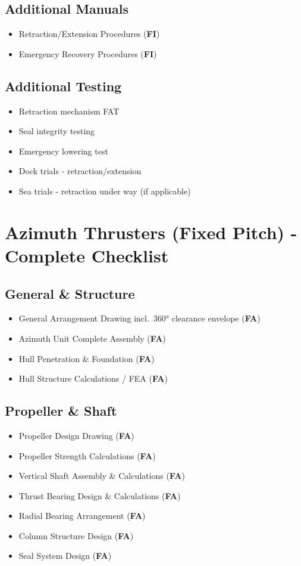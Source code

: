 \documentclass[11pt,a4paper]{report}
\newcommand{\fa}{\textbf{\textcolor{warningred}{FA}}}
\newcommand{\fic}{\textbf{\textcolor{bvgray}{FI}}}
\begin{document}
\subsection{Additional Manuals}
\begin{itemize}[label=$\square$]
\item Retraction/Extension Procedures (\fic{})
\item Emergency Recovery Procedures (\fic{})
\end{itemize}

\subsection{Additional Testing}
\begin{itemize}[label=$\square$]
\item Retraction mechanism FAT
\item Seal integrity testing
\item Emergency lowering test
\item Dock trials - retraction/extension
\item Sea trials - retraction under way (if applicable)
\end{itemize}

\section{Azimuth Thrusters (Fixed Pitch) - Complete Checklist}

\subsection{General \& Structure}
\begin{itemize}[label=$\square$]
\item General Arrangement Drawing incl.\ 360° clearance envelope (\fa{})
\item Azimuth Unit Complete Assembly (\fa{})
\item Hull Penetration \& Foundation (\fa{})
\item Hull Structure Calculations / FEA (\fa{})
\end{itemize}

\subsection{Propeller \& Shaft}
\begin{itemize}[label=$\square$]
\item Propeller Design Drawing (\fa{})
\item Propeller Strength Calculations (\fa{})
\item Vertical Shaft Assembly \& Calculations (\fa{})
\item Thrust Bearing Design \& Calculations (\fa{})
\item Radial Bearing Arrangement (\fa{})
\item Column Structure Design (\fa{})
\item Seal System Design (\fa{})
\end{itemize}
\end{document}
